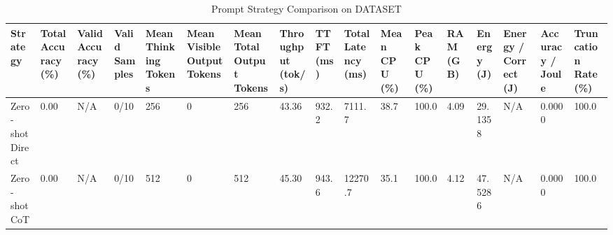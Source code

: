 \begin{table}
\caption{Prompt Strategy Comparison on DATASET}
\label{tab:strategy_comparison}
\begin{tabular}{lllllllllllllllll}
\toprule
Strategy & Total Accuracy (\%) & Valid Accuracy (\%) & Valid Samples & Mean Thinking Tokens & Mean Visible Output Tokens & Mean Total Output Tokens & Throughput (tok/s) & TTFT (ms) & Total Latency (ms) & Mean CPU (\%) & Peak CPU (\%) & RAM (GB) & Energy (J) & Energy / Correct (J) & Accuracy / Joule & Truncation Rate (\%) \\
\midrule
Zero-shot Direct & 0.00 & N/A & 0/10 & 256 & 0 & 256 & 43.36 & 932.2 & 7111.7 & 38.7 & 100.0 & 4.09 & 29.1358 & N/A & 0.0000 & 100.0 \\
Zero-shot CoT & 0.00 & N/A & 0/10 & 512 & 0 & 512 & 45.30 & 943.6 & 12270.7 & 35.1 & 100.0 & 4.12 & 47.5286 & N/A & 0.0000 & 100.0 \\
\bottomrule
\end{tabular}
\end{table}
